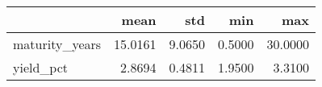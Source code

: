\begin{tabular}{lrrrr}
\toprule
 & mean & std & min & max \\
\midrule
maturity_years & 15.0161 & 9.0650 & 0.5000 & 30.0000 \\
yield_pct & 2.8694 & 0.4811 & 1.9500 & 3.3100 \\
\bottomrule
\end{tabular}
